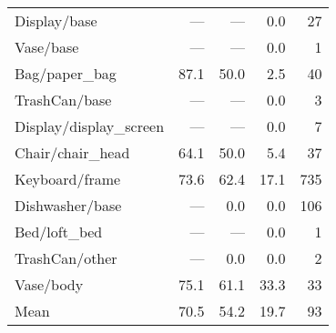 \begin{table}[!htb]
\begin{tabular}{lrrrr}
Display/base             &  --- &        --- &     0.0 &             27 \\
Vase/base                &  --- &        --- &     0.0 &              1 \\
Bag/paper\_bag            & 87.1 &       50.0 &     2.5 &             40 \\
TrashCan/base            &  --- &        --- &     0.0 &              3 \\
Display/display\_screen   &  --- &        --- &     0.0 &              7 \\
Chair/chair\_head         & 64.1 &       50.0 &     5.4 &             37 \\
Keyboard/frame           & 73.6 &       62.4 &    17.1 &            735 \\
Dishwasher/base          &  --- &        0.0 &     0.0 &            106 \\
Bed/loft\_bed             &  --- &        --- &     0.0 &              1 \\
TrashCan/other           &  --- &        0.0 &     0.0 &              2 \\
Vase/body                & 75.1 &       61.1 &    33.3 &             33 \\
\midrule
Mean                     & 70.5 &       54.2 &    19.7 &             93 \\
\bottomrule
\end{tabular}
\end{table}




